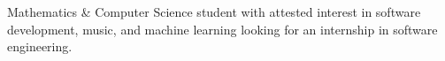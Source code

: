 Mathematics \& Computer Science student with attested interest in software development, music, and machine learning looking for an internship in software engineering.
